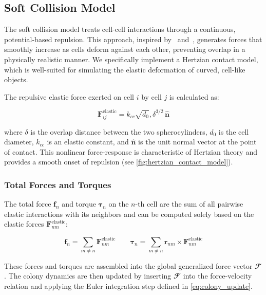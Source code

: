 \documentclass[conference]{IEEEtran}
\begin{document}
\newpage

\subsection{Soft Collision Model}

The soft collision model treats cell-cell interactions through a continuous, potential-based repulsion. This approach, inspired by~\cite{Warren2019} and~\cite{You2018}, generates forces that smoothly increase as cells deform against each other, preventing overlap in a physically realistic manner. We specifically implement a Hertzian contact model, which is well-suited for simulating the elastic deformation of curved, cell-like objects.

The repulsive elastic force exerted on cell $i$ by cell $j$ is calculated as:

\begin{equation} \label{eq:hertzian_contact_model}
    \mathbf{F}^{\text{elastic}}_{ij} = k_{cc} \sqrt{d_0} , \delta^{3/2} \, \hat{\mathbf{n}}
\end{equation}

where $\delta$ is the overlap distance between the two spherocylinders, $d_0$ is the cell diameter, $k_{cc}$ is an elastic constant, and $\hat{\mathbf{n}}$ is the unit normal vector at the point of contact. This nonlinear force-response is characteristic of Hertzian theory and provides a smooth onset of repulsion (see \autoref{fig:hertzian_contact_model}).

\subsubsection{Total Forces and Torques}

The total force $\mathbf{f}_n$ and torque $\boldsymbol{\tau}_n$ on the $n$-th cell are the sum of all pairwise elastic interactions with its neighbors and can be computed solely based on the elastic forces $\mathbf{F}^{\text{elastic}}_{nm}$:

\begin{equation}
    \mathbf{f}_n         = \sum_{m \neq n} \mathbf{F}^{\text{elastic}}_{nm} \qquad
    \boldsymbol{\tau}_n  = \sum_{m \neq n} \mathbf{r}_{nm} \times \mathbf{F}^{\text{elastic}}_{nm}
\end{equation}

These forces and torques are assembled into the global generalized force vector $\mathbfcal{F}$. The colony dynamics are then updated by inserting $\mathbfcal{F}$ into the force-velocity relation and applying the Euler integration step defined in \autoref{eq:colony_update}.
\end{document}
